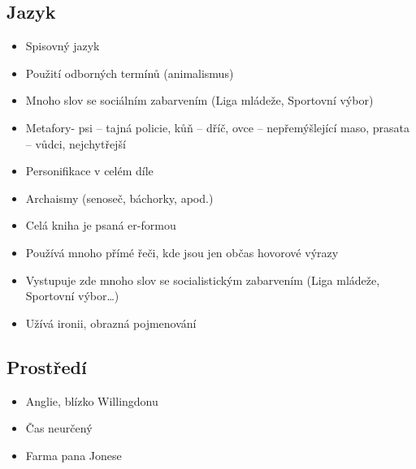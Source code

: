 \documentclass{article}
\begin{document}
\subsection{Jazyk}
\begin{itemize}
    \item Spisovný jazyk
    \item Použití odborných termínů (animalismus)
    \item Mnoho slov se sociálním zabarvením (Liga mládeže, Sportovní výbor)
    \item Metafory- psi – tajná policie, kůň – dříč, ovce – nepřemýšlející maso, prasata – vůdci, nejchytřejší
    \item Personifikace v celém díle
    \item Archaismy (senoseč, báchorky, apod.)
    \item Celá kniha je psaná er-formou
    \item Používá mnoho přímé řeči, kde jsou jen občas hovorové výrazy
    \item Vystupuje zde mnoho slov se socialistickým zabarvením (Liga mládeže, Sportovní výbor…)
    \item Užívá ironii, obrazná pojmenování
\end{itemize}

\subsection{Prostředí}
\begin{itemize}
    \item Anglie, blízko Willingdonu
    \item Čas neurčený
    \item Farma pana Jonese
\end{itemize}
\end{document}
